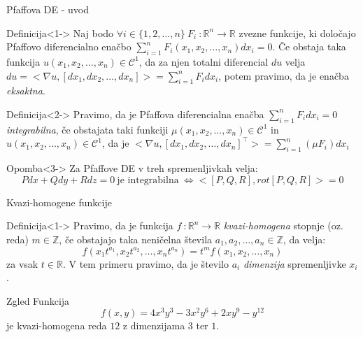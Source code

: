 \documentclass[t, 8pt]{beamer} %
\newcommand{\mth}[1]{\ensuremath{\mathbb{#1}}}
\newcommand{\R}{\mth{R}}
\newcommand{\Z}{\mth{Z}}
\newcommand{\pojem}[1]{\emph{#1}}
\newcommand{\map}[3]{\ensuremath{{#1}~: {#2} \rightarrow {#3}}}
\newcommand{\fillblack}[1]{
	\begin{tikzpicture}[remember picture, overlay]
		\node [shift={(0 cm,0cm)}]  at (current page.south west)
		{%
			\begin{tikzpicture}[remember picture, overlay] at (current page.south west)
				\draw [fill=black] (0, 0) -- (0,#1 \paperheight) --
				(\paperwidth,#1 \paperheight) -- (\paperwidth,0) -- cycle ;
			\end{tikzpicture}
		};
		\draw (current page.north west) rectangle (current page.south east);
	\end{tikzpicture}
}
\begin{document}
	\begin{frame}{Pfaffova DE - uvod}
		
		\begin{block}{Definicija}<1->
			Naj bodo $\forall i\in\{1, 2, \ldots, n\}~ \map{F_i}{\R^n}{\R}$ zvezne funkcije, ki določajo Pfaffovo diferencialno enačbo $\sum_{i = 1}^{n}F_i(x_1, x_2, \ldots, x_n)dx_i = 0$. Če obstaja taka funkcija $u(x_1, x_2, \ldots, x_n)\in \mathcal{C}^1$, da za njen totalni diferencial $du$ velja $du = <\nabla u, [dx_1, dx_2, \ldots, dx_n]> = \sum_{i = 1}^{n}F_i dx_i$, potem pravimo, da je enačba \pojem{eksaktna}.
		\end{block}
		\begin{block}{Definicija}<2->
			Pravimo, da je Pfaffova diferencialna enačba $\sum_{i = 1}^n F_i dx_i = 0$ \pojem{integrabilna}, če obstajata taki funkciji $\mu(x_1, x_2, \ldots, x_n)\in \mathcal{C}^1$ in $u(x_1, x_2, \ldots, x_n)\in \mathcal{C}^1$, da je $<\nabla u,[dx_1, dx_2, \ldots, dx_n]^\top> = \sum_{i = 1}^n (\mu F_i) dx_i$
		\end{block}
		\begin{block}{Opomba}<3->
			Za Pfaffove DE v treh spremenljivkah velja: $$ Pdx + Qdy + Rdz = 0~\text{je integrabilna}~\iff <[P, Q, R], rot[P, Q, R]> = 0$$
		\end{block}
		
	\end{frame}
	
	\begin{frame}{Kvazi-homogene funkcije}
		\begin{block}{Definicija}<1->
			Pravimo, da je funkcija $\map{f}{\R^n}{\R}$ \pojem{kvazi-homogena} stopnje (oz. reda) $m\in\Z$, če obstajajo taka neničelna števila $a_1, a_2, \ldots, a_n \in \Z$, da velja: $$f(x_1t^{a_1}, x_2t^{a_2}, \ldots, x_nt^{a_n}) = t^mf(x_1, x_2, \ldots, x_n)$$
			za vsak $t\in\R$.
			V tem primeru pravimo, da je število $a_i$ \pojem{dimenzija} spremenljivke $x_i$.
		\end{block}
		\begin{block}{Zgled}
			Funkcija $$f(x, y) = 4x^3y^3 -3x^2y^6 + 2xy^9 - y^{12}$$ je kvazi-homogena reda $12$ z dimenzijama $3$ ter $1$.
		\end{block}
	\end{frame}
	
\end{document}
